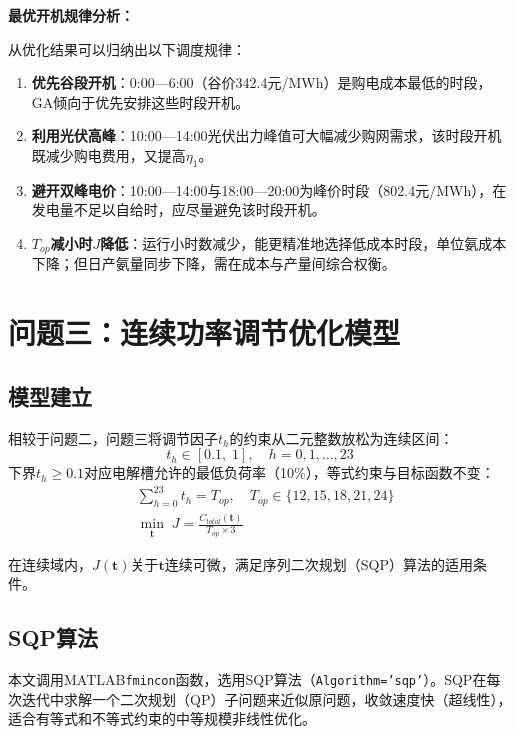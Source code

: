 \documentclass[UTF8,12pt,a4paper]{ctexart}
\begin{document}
\noindent\textbf{最优开机规律分析：}

从优化结果可以归纳出以下调度规律：
\begin{enumerate}[leftmargin=3em, itemsep=0.2em]
  \item \textbf{优先谷段开机}：0:00—6:00（谷价342.4元/MWh）是购电成本最低的时段，GA倾向于优先安排这些时段开机。
  \item \textbf{利用光伏高峰}：10:00—14:00光伏出力峰值可大幅减少购网需求，该时段开机既减少购电费用，又提高$\eta_1$。
  \item \textbf{避开双峰电价}：10:00—14:00与18:00—20:00为峰价时段（802.4元/MWh），在发电量不足以自给时，应尽量避免该时段开机。
  \item \textbf{$T_{op}$减小时$J$降低}：运行小时数减少，能更精准地选择低成本时段，单位氨成本下降；但日产氨量同步下降，需在成本与产量间综合权衡。
\end{enumerate}

\section{问题三：连续功率调节优化模型}

\subsection{模型建立}

相较于问题二，问题三将调节因子$t_h$的约束从二元整数放松为连续区间：
\begin{equation}
  t_h \in [0.1,\;1],\quad h=0,1,\ldots,23
  \label{eq:p3var}
\end{equation}
下界$t_h\geq0.1$对应电解槽允许的最低负荷率（10\%），等式约束与目标函数不变：
\begin{align}
  &\sum_{h=0}^{23} t_h = T_{op}, \quad T_{op}\in\{12,15,18,21,24\} \label{eq:p3eq} \\
  &\min_{\mathbf{t}}\; J = \frac{C_{total}(\mathbf{t})}{T_{op}\times 3} \label{eq:p3obj}
\end{align}

在连续域内，$J(\mathbf{t})$关于$\mathbf{t}$连续可微，满足序列二次规划（SQP）算法的适用条件。

\subsection{SQP算法}

本文调用MATLAB\texttt{fmincon}函数，选用SQP算法（\texttt{Algorithm='sqp'}）。SQP在每次迭代中求解一个二次规划（QP）子问题来近似原问题，收敛速度快（超线性），适合有等式和不等式约束的中等规模非线性优化。
\end{document}
